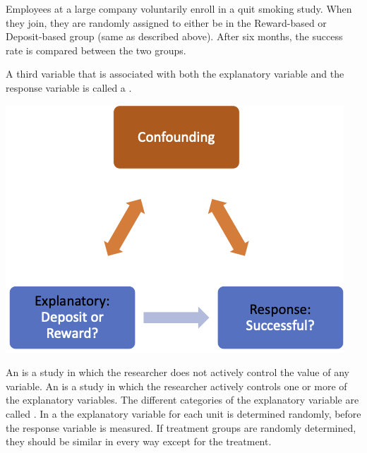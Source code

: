 \ii  Employees at a large company voluntarily enroll in a quit smoking study. When they join, they are randomly assigned to either be in the Reward-based or Deposit-based group (same as described above). After six months, the success rate is compared between the two groups.
\ee
\ee

\vfill

\begin{multicols}{2}

\bbox
A third variable that is associated with both the explanatory variable and the response variable is called a \textbf{}.
\ebox

\columnbreak

\includegraphics[width=0.45\tw]{01/fig-confounding.png}

\end{multicols}

\clearpage


\bbox
\bi
\ii An \textbf{} is a study in which the researcher does not actively control the value of any variable.
\ii An \textbf{} is a study in which the researcher actively controls one or more of the explanatory variables.
\ii The different categories of the explanatory variable are called \textbf{}.
\ii In a \textbf{} the explanatory variable for each unit is determined randomly,
before the response variable is measured.
\ii If treatment groups are randomly determined, they should be similar in every way except for the treatment.
\ii {}
\ei
\ebox

